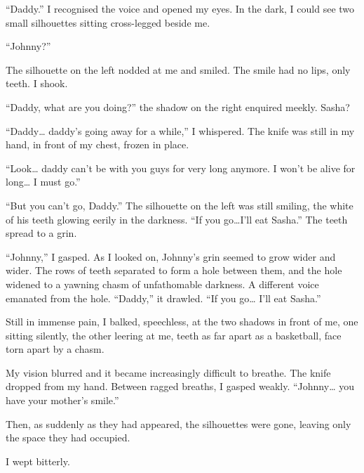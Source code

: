 ``Daddy.'' I recognised the voice and opened my eyes. In the dark, I
could see two small silhouettes sitting cross-legged beside
me.

``Johnny?''

The silhouette on the left nodded at me and smiled. The smile had
no lips, only teeth. I shook.

``Daddy, what are you doing?'' the shadow on the right enquired
meekly. Sasha?

``Daddy{\ldots} daddy's going away for a while,'' I whispered. The knife
was still in my hand, in front of my chest, frozen in place.

``Look{\ldots} daddy can't be with you guys for very long anymore. I won't
be alive for long{\ldots} I must go.''

``But you can't go, Daddy.'' The silhouette on the left was still
smiling, the white of his teeth glowing eerily in the darkness. ``If
you go{\ldots}I'll eat Sasha.'' The teeth spread to a grin.



``Johnny,'' I gasped. As I looked on, Johnny's grin seemed to
grow wider and wider. The rows of teeth separated to form a hole between
them, and the hole widened to a yawning chasm of unfathomable
darkness. A different voice emanated from the hole. ``Daddy,'' it
drawled. ``If you go{\ldots} I'll eat Sasha.''



Still in immense pain, I balked, speechless, at the two shadows in
front of me, one sitting silently, the other leering at me, teeth
as far apart as a basketball, face torn apart by a chasm.

My vision blurred and it became increasingly difficult to breathe.
The knife dropped from my hand. Between ragged breaths, I gasped
weakly. ``Johnny{\ldots} you have your mother's smile.''



Then, as suddenly as they had appeared, the silhouettes were gone,
leaving only the space they had occupied.



I wept bitterly. 
 



